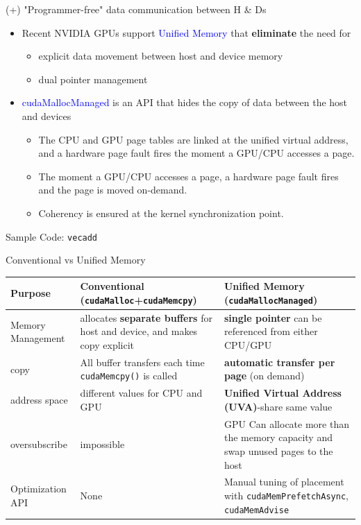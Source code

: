 \documentclass[dvipdfmx, 11pt, aspectratio=169]{beamer}   %
\begin{document}
\begin{frame}{(+) "Programmer-free" data communication between H \& Ds}
  \begin{itemize}[<+->]
    \item Recent NVIDIA GPUs support \textcolor{blue}{Unified Memory} that \textbf{eliminate} the need for 
    \begin{itemize}
      \item explicit data movement between host and device memory
      \item dual pointer management
    \end{itemize}
    \item \textcolor{blue}{cudaMallocManaged} is an API that hides the copy of data between the host and devices
    \begin{itemize}
      \item The CPU and GPU page tables are linked at the unified virtual address, and a hardware page fault fires the moment a GPU/CPU accesses a page.
      \item The moment a GPU/CPU accesses a page, a hardware page fault fires and the page is moved on-demand.
      \item Coherency is ensured at the kernel synchronization point.
    \end{itemize}
  \end{itemize}
  Sample Code: \texttt{vecadd}
\end{frame}
\begin{frame}[fragile]{Conventional vs Unified Memory}
  \begin{table}
    \centering
    {\footnotesize
      \begin{tabularx}{\textwidth}{@{}l L L@{}}
        Purpose & Conventional (\lstinline|cudaMalloc|+\lstinline|cudaMemcpy|) & Unified Memory (\lstinline|cudaMallocManaged|)\\\midrule[1pt]
        Memory Management & allocates \textbf{separate buffers} for host and device, and makes copy explicit & \textbf{single pointer} can be referenced from either CPU/GPU\\\midrule
        copy & All buffer transfers each time \lstinline|cudaMemcpy()| is called & \textbf{automatic transfer per page} (on demand) \\\midrule
        address space & different values for CPU and GPU & \textbf{Unified Virtual Address (UVA)}-share same value \\\midrule
        oversubscribe & impossible & GPU Can allocate more than the memory capacity and swap unused pages to the host \\\midrule
        Optimization API & None & Manual tuning of placement with \lstinline|cudaMemPrefetchAsync|, \lstinline|cudaMemAdvise|\\
        \bottomrule
      \end{tabularx}
    }
  \end{table}
\end{frame}
\end{document}
